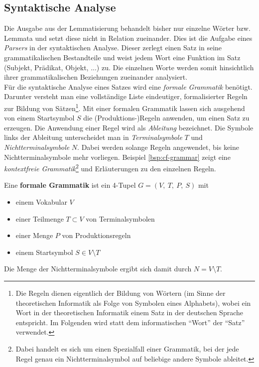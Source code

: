 \documentclass[
	a4paper,
	12pt,
	bibliography=totocnumbered,
	twoside,
]{scrreprt}
\begin{document}
\subsection*{Syntaktische Analyse}
Die Ausgabe aus der Lemmatisierung behandelt bisher nur einzelne Wörter bzw. Lemmata und setzt diese nicht in Relation zueinander. Dies ist die Aufgabe eines \textit{Parsers} in der syntaktischen Analyse. Dieser zerlegt einen Satz in seine grammatikalischen Bestandteile und weist jedem Wort eine Funktion im Satz (Subjekt, Prädikat, Objekt, ...) zu. Die einzelnen Worte werden somit hinsichtlich ihrer grammatikalischen Beziehungen zueinander analysiert.\\

Für die syntaktische Analyse eines Satzes wird eine \textit{formale Grammatik} benötigt. Darunter versteht man eine vollständige Liste eindeutiger, formalisierter Regeln zur Bildung von Sätzen\footnote{Die Regeln dienen eigentlich der Bildung von Wörtern (im Sinne der theoretischen Informatik als Folge von Symbolen eines Alphabets), wobei ein Wort in der theoretischen Informatik einem Satz in der deutschen Sprache entspricht. Im Folgenden wird statt dem informatischen "`Wort"' der "`Satz"' verwendet.}. Mit einer formalen Grammatik lassen sich ausgehend von einem Startsymbol $S$ die (Produktions-)Regeln anwenden, um einen Satz zu erzeugen. Die Anwendung einer Regel wird als \textit{Ableitung} bezeichnet. Die Symbole links der Ableitung unterscheidet man in \textit{Terminalsymbole} $T$ und \textit{Nichtterminalsymbole} $N$. Dabei werden solange Regeln angewendet, bis keine Nichtterminalsymbole mehr vorliegen. Beispiel \ref{bsp:cf-grammar} zeigt eine \textit{kontextfreie Grammatik}\footnote{Dabei handelt es sich um einen Spezialfall einer Grammatik, bei der jede Regel genau ein Nichtterminalsymbol auf beliebige andere Symbole ableitet.} und Erläuterungen zu den einzelnen Regeln. \\

\begin{Definition}
    \label{def:grammatik}
    Eine \textbf{formale Grammatik} ist ein 4-Tupel $G = (V, \ T, \ P, \ S)$ mit
    \begin{itemize}
        \item einem Vokabular $V$
        \item einer Teilmenge $T \subset V$ von Terminalsymbolen
        \item einer Menge $P$ von Produktionsregeln
        \item einem Startsymbol $S \in V \setminus T$
    \end{itemize}
    Die Menge der Nichtterminalsymbole ergibt sich damit durch $N = V \setminus T$.
\end{Definition}
\end{document}
